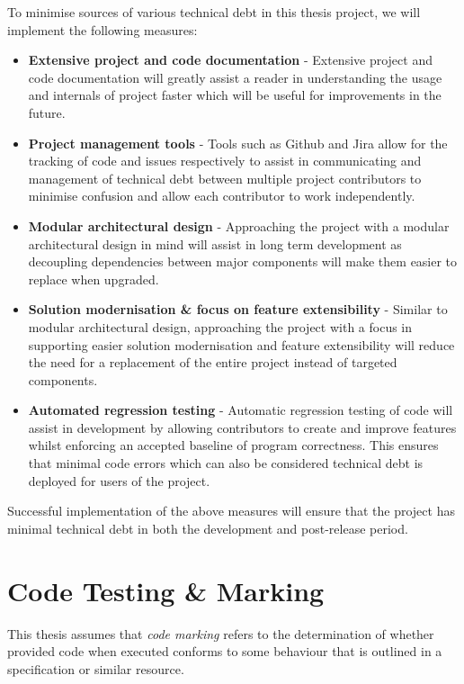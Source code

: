 \documentclass[hidelinks]{report}
\begin{document}
To minimise sources of various technical debt in this thesis project, we will implement the following measures:
\begin{itemize}
	\item \textbf{Extensive project and code documentation} - Extensive project and code documentation will greatly assist a reader in understanding the usage and internals of project faster which will be useful for improvements in the future.
	\item \textbf{Project management tools} - Tools such as Github and Jira allow for the tracking of code and issues respectively to assist in communicating and management of technical debt between multiple project contributors to minimise confusion and allow each contributor to work independently.
	\item \textbf{Modular architectural design} - Approaching the project with a modular architectural design in mind will assist in long term development as decoupling dependencies between major components will make them easier to replace when upgraded.
	\item \textbf{Solution modernisation \& focus on feature extensibility} - Similar to modular architectural design, approaching the project with a focus in supporting easier solution modernisation and feature extensibility will reduce the need for a replacement of the entire project instead of targeted components.
	\item \textbf{Automated regression testing} - Automatic regression testing of code will assist in development by allowing contributors to create and improve features whilst enforcing an accepted baseline of program correctness. This ensures that minimal code errors which can also be considered technical debt is deployed for users of the project.
\end{itemize}

Successful implementation of the above measures will ensure that the project has minimal technical debt in both the development and post-release period.

\section{Code Testing \& Marking}

This thesis assumes that \textit{code marking} refers to the determination of whether provided code when executed conforms to some behaviour that is outlined in a specification or similar resource.
\end{document}
